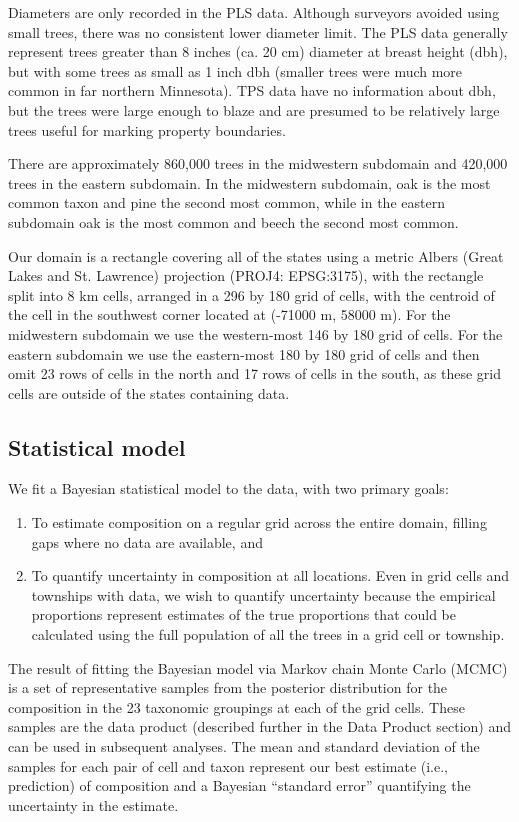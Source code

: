 \documentclass[10pt,letterpaper]{article}
\begin{document}
Diameters are only recorded in the PLS data. Although surveyors avoided
using small trees, there was no consistent lower diameter limit. The
PLS data generally represent trees greater than 8 inches (ca. 20
cm) diameter at breast height (dbh), but with some trees as small
as 1 inch dbh (smaller trees were much more common in far northern
Minnesota). TPS data have no information about dbh, but the trees
were large enough to blaze and are presumed to be relatively large
trees useful for marking property boundaries.

There are approximately 860,000 trees in the midwestern subdomain
and 420,000 trees in the eastern subdomain. In the midwestern subdomain,
oak is the most common taxon and pine the second most common, while
in the eastern subdomain oak is the most common and beech the second
most common.

Our domain is a rectangle covering all of the states using a metric
Albers (Great Lakes and St. Lawrence) projection (PROJ4: EPSG:3175),
with the rectangle split into 8 km cells, arranged in a 296 by 180
grid of cells, with the centroid of the cell in the southwest corner
located at (-71000 m, 58000 m). For the midwestern subdomain we use
the western-most 146 by 180 grid of cells. For the eastern subdomain
we use the eastern-most 180 by 180 grid of cells and then omit 23
rows of cells in the north and 17 rows of cells in the south, as these
grid cells are outside of the states containing data.


\subsection*{Statistical model\label{sec:Statistical-model}}

We fit a Bayesian statistical model to the data, with two primary
goals:
\begin{enumerate}
\item To estimate composition on a regular grid across the entire domain,
filling gaps where no data are available, and
\item To quantify uncertainty in composition at all locations. Even in grid
cells and townships with data, we wish to quantify uncertainty because
the empirical proportions represent estimates of the true proportions
that could be calculated using the full population of all the trees
in a grid cell or township.
\end{enumerate}
The result of fitting the Bayesian model via Markov chain Monte Carlo
(MCMC) is a set of representative samples from the posterior distribution
for the composition in the 23 taxonomic groupings at each of the grid
cells. These samples are the data product (described further in the
Data Product section) and can be used in subsequent analyses. The
mean and standard deviation of the samples for each pair of cell and
taxon represent our best estimate (i.e., prediction) of composition
and a Bayesian ``standard error'' quantifying the uncertainty in
the estimate. 
\end{document}
